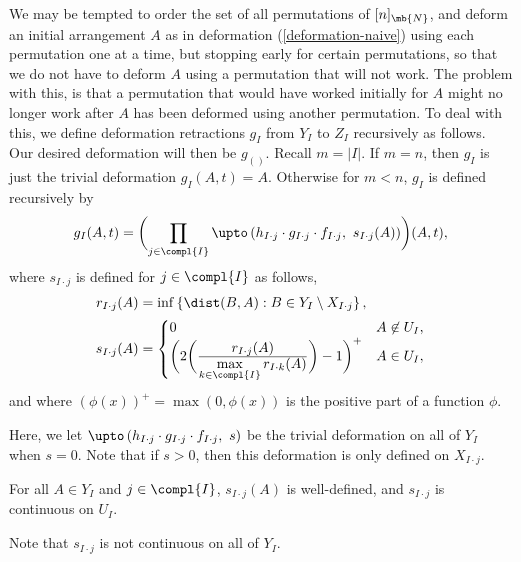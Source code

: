 We may be tempted to order the set of all permutations of $[n]_\mb{N}$, and deform an initial arrangement $A$ as in deformation (\ref{deformation-naive}) using each permutation one at a time, but stopping early for certain permutations, so that we do not have to deform $A$ using a permutation that will not work. The problem with this, is that a permutation that would have worked initially for $A$ might no longer work after $A$ has been deformed using another permutation. To deal with this, we define deformation retractions $g_I$ from $Y_I$ to $Z_I$ recursively as follows. Our desired deformation will then be $g_{()}$.
Recall $m=|I|$.
If $m=n$, then $g_I$ is just the trivial deformation $g_I({A},t) = {A}$.
Otherwise for $m<n$, $g_I$ is defined recursively by
\begin{equation}\label{equation-g}
g_{I}({A},t) = \biggl( \prod_{j \in \compl{I} } \upto\left(h_{I \cdot j} \cdot g_{I \cdot j} \cdot f_{I \cdot j},\ s_{I \cdot j} ({A}) \right)\biggr) ({A},t),
\end{equation}
where $s_{I \cdot j}$ is defined for $j \in \compl{I}$ as follows,
\begin{align*}
r_{I\cdot j}(A) &= \inf \left\{\dist(B,A): B \in Y_{I} \setminus X_{I\cdot j} \right\},\\
s_{I \cdot j}(A) &= \begin{cases}
0 & A \not\in U_{I}, \\
\biggl(2\biggl(\frac{\displaystyle r_{I\cdot j}({A})}{\displaystyle \max_{k \in \compl{I}} r_{I\cdot k}({A}) }\biggr) -1 \biggr)^+ & A \in U_{I}, \\
\end{cases}
\end{align*}
and where $(\phi(x))^+ = \max(0,\phi(x))$ is the positive part of a function $\phi$.

Here, we let $\upto\left(h_{I \cdot j} \cdot g_{I \cdot j} \cdot f_{I \cdot j},\ s \right)$ be the trivial deformation on all of $Y_I$ when $s=0$. Note that if $s > 0$, then this deformation is only defined on $X_{I\cdot j}$.

\begin{claim}\label{claim-s}
For all $A \in Y_I$ and $j \in \compl{I}$, $s_{I\cdot j}(A)$ is well-defined, and $s_{I\cdot j}$ is continuous on $U_{I}$.
\end{claim}

Note that $s_{I\cdot j}$ is not continuous on all of $Y_I$.

